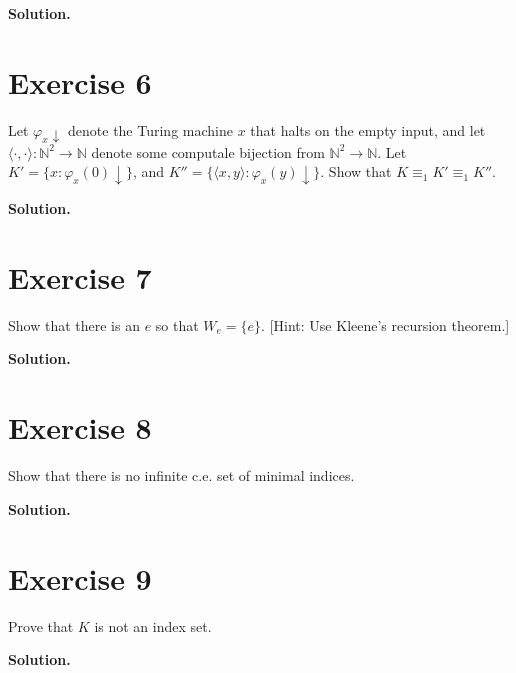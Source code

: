 \documentclass{article}
\newcommand{\nat}{\mathbb{N}}
\newcommand{\solution}{\noindent \textbf{Solution.}}
\begin{document}
\vspace{3mm}
\solution


\newpage
\section*{Exercise 6}
Let $\varphi_x\downarrow$ denote the Turing machine $x$ that halts on the empty input, and let $\langle \cdot, \cdot \rangle: \nat^2 \to \nat$ denote some computale bijection from $\nat^2 \to \nat$.
Let $K' = \{x : \varphi_x(0)\downarrow\}$, and $K'' = \{\langle x, y \rangle : \varphi_x(y)\downarrow\}.$
Show that $K \equiv_1 K' \equiv_1 K''$.

\vspace{3mm}
\solution


\newpage
\section*{Exercise 7}
Show that there is an $e$ so that $W_e = \{e\}$.
[Hint: Use Kleene's recursion theorem.]

\vspace{3mm}
\solution

\newpage
\section*{Exercise 8}
Show that there is no infinite c.e. set of minimal indices.

\vspace{3mm}
\solution

\newpage
\section*{Exercise 9}
Prove that $K$ is not an index set.

\vspace{3mm}
\solution
\end{document}
